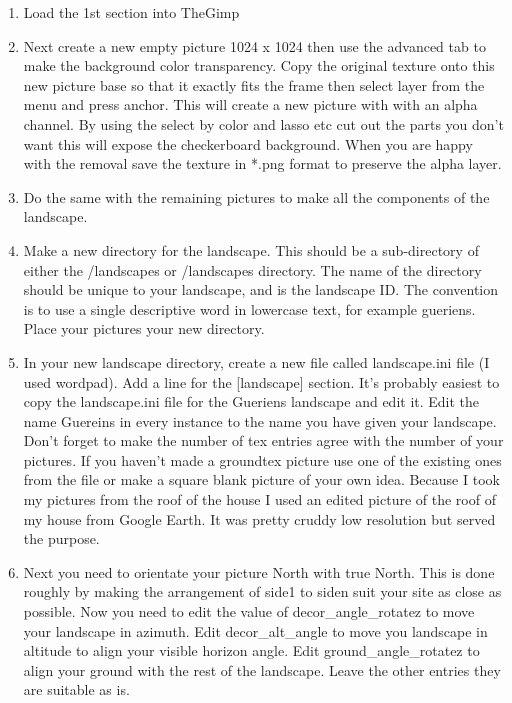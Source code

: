 \begin{enumerate}
\item
  Load the 1st section into TheGimp
\item
  Next create a new empty picture 1024 x 1024 then use the advanced tab
  to make the background color transparency. Copy the original texture
  onto this new picture base so that it exactly fits the frame then
  select layer from the menu and press anchor. This will create a new
  picture with with an alpha channel. By using the select by color and
  lasso etc cut out the parts you don't want this will expose the
  checkerboard background. When you are happy with the removal save the
  texture in *.png format to preserve the alpha layer.
\item
  Do the same with the remaining pictures to make all the components of
  the landscape.
\item
  Make a new directory for the landscape. This should be a sub-directory
  of either the /landscapes or /landscapes directory. The name of the
  directory should be unique to your landscape, and is the landscape ID.
  The convention is to use a single descriptive word in lowercase text,
  for example gueriens. Place your pictures your new directory.
\item
  In your new landscape directory, create a new file called
  landscape.ini file (I used wordpad). Add a line for the
  {[}landscape{]} section. It's probably easiest to copy the
  landscape.ini file for the Gueriens landscape and edit it. Edit the
  name Guereins in every instance to the name you have given your
  landscape. Don't forget to make the number of tex entries agree with
  the number of your pictures. If you haven't made a groundtex picture
  use one of the existing ones from the file or make a square blank
  picture of your own idea. Because I took my pictures from the roof of
  the house I used an edited picture of the roof of my house from Google
  Earth. It was pretty cruddy low resolution but served the purpose.
\item
  Next you need to orientate your picture North with true North. This is
  done roughly by making the arrangement of side1 to siden suit your
  site as close as possible. Now you need to edit the value of
  decor\_angle\_rotatez to move your landscape in azimuth. Edit
  decor\_alt\_angle to move you landscape in altitude to align your
  visible horizon angle. Edit ground\_angle\_rotatez to align your
  ground with the rest of the landscape. Leave the other entries they
  are suitable as is.
\end{enumerate}

